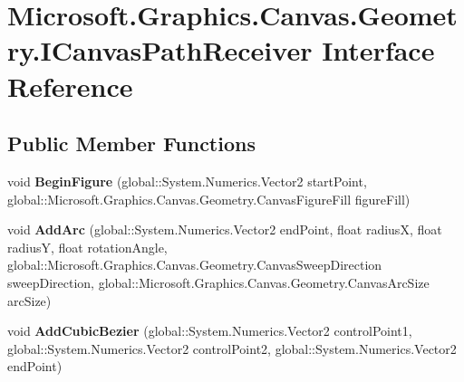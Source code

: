 \hypertarget{interface_microsoft_1_1_graphics_1_1_canvas_1_1_geometry_1_1_i_canvas_path_receiver}{}\section{Microsoft.\+Graphics.\+Canvas.\+Geometry.\+I\+Canvas\+Path\+Receiver Interface Reference}
\label{interface_microsoft_1_1_graphics_1_1_canvas_1_1_geometry_1_1_i_canvas_path_receiver}
\subsection*{Public Member Functions}
\begin{DoxyCompactItemize}
\item 
\mbox{\label{interface_microsoft_1_1_graphics_1_1_canvas_1_1_geometry_1_1_i_canvas_path_receiver_aef7e5c282cbb5cd2800c4626abdf7981}} 
void {\bfseries Begin\+Figure} (global\+::\+System.\+Numerics.\+Vector2 start\+Point, global\+::\+Microsoft.\+Graphics.\+Canvas.\+Geometry.\+Canvas\+Figure\+Fill figure\+Fill)
\item 
\mbox{\label{interface_microsoft_1_1_graphics_1_1_canvas_1_1_geometry_1_1_i_canvas_path_receiver_a50a4758a3ed76ce6c8cd9868b31e29cf}} 
void {\bfseries Add\+Arc} (global\+::\+System.\+Numerics.\+Vector2 end\+Point, float radiusX, float radiusY, float rotation\+Angle, global\+::\+Microsoft.\+Graphics.\+Canvas.\+Geometry.\+Canvas\+Sweep\+Direction sweep\+Direction, global\+::\+Microsoft.\+Graphics.\+Canvas.\+Geometry.\+Canvas\+Arc\+Size arc\+Size)
\item 
\mbox{\label{interface_microsoft_1_1_graphics_1_1_canvas_1_1_geometry_1_1_i_canvas_path_receiver_ab770bd039e07f19239a6f9f563ccd042}} 
void {\bfseries Add\+Cubic\+Bezier} (global\+::\+System.\+Numerics.\+Vector2 control\+Point1, global\+::\+System.\+Numerics.\+Vector2 control\+Point2, global\+::\+System.\+Numerics.\+Vector2 end\+Point)
\item 
\mbox{\label{interface_microsoft_1_1_graphics_1_1_canvas_1_1_geometry_1_1_i_canvas_path_receiver_af4c3299bef8e5d0a0d801f7e730857f9}} 

\end{DoxyCompactItemize}

